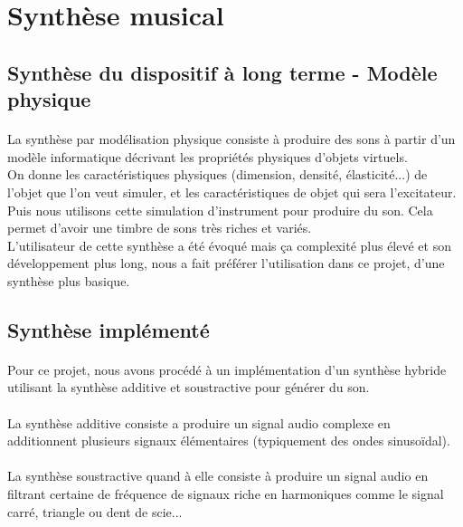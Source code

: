 \documentclass[a4paper, titlepage, oneside, 12pt]{article}%
\begin{document}
\section{Synthèse musical}
\subsection{Synthèse du dispositif à long terme - Modèle physique}
\paragraph{}
La synthèse par modélisation physique consiste à produire des sons à partir d'un modèle informatique décrivant les propriétés physiques d'objets virtuels.\\
On donne les caractéristiques physiques (dimension, densité, élasticité...) de l'objet que l'on veut simuler, et les caractéristiques de objet qui sera l’excitateur.\\
Puis nous utilisons cette simulation d'instrument pour produire du son. Cela permet d'avoir une timbre de sons très riches et variés.\\
L'utilisateur de cette synthèse a été évoqué mais ça complexité plus élevé et son développement plus long, nous a fait préférer l'utilisation dans ce projet, d'une synthèse plus basique.

\subsection{Synthèse implémenté}
\paragraph{}
Pour ce projet, nous avons procédé à un implémentation d'un synthèse hybride utilisant la synthèse additive et soustractive pour générer du son.
\paragraph{}
La synthèse additive consiste a produire un signal audio complexe en additionnent plusieurs signaux élémentaires (typiquement des ondes sinusoïdal).
\paragraph{}
La synthèse soustractive quand à elle consiste à produire un signal audio en filtrant certaine de fréquence de signaux riche en harmoniques comme le signal carré, triangle ou dent de scie... 
\end{document}
